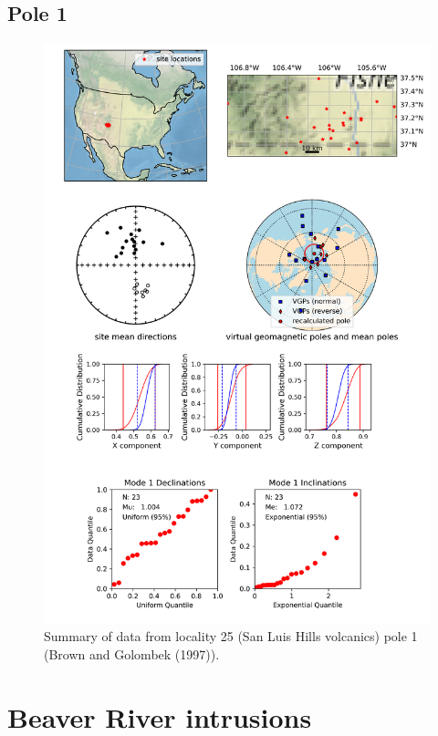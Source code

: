 \documentclass{article}
\begin{document}
\subsection{Pole 1}


\begin{figure}[H]
\centering
\includegraphics[width=5 in]{./25/1/pole_summary.png}
\caption{Summary of data from locality 25 (San Luis Hills volcanics) pole 1 (Brown and Golombek (1997)).}
\end{figure}

\section{Beaver River intrusions}
\end{document}
